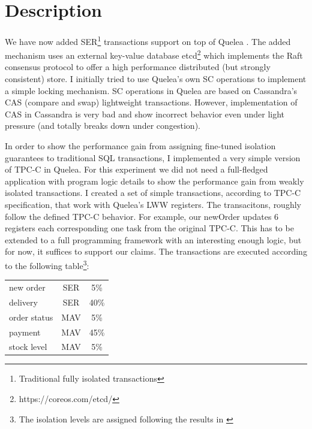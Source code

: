 \documentclass[12pt,letter]{article}
\begin{document}


\section{Description}
\paragraph{}
We have now added SER\footnote{Traditional fully isolated transactions}
transactions support on top of Quelea \cite{quelea}. The added mechanism uses an
external key-value database etcd\footnote{https://coreos.com/etcd/}
which implements the Raft consensus protocol to offer a high performance
distributed (but strongly consistent) store. I initially tried to use
Quelea's own SC operations to implement a simple locking mechanism. SC operations in Quelea are based on Cassandra's CAS
(compare and swap) lightweight transactions. However, implementation of CAS 
in Cassandra is very bad and show incorrect behavior even under light pressure
(and totally breaks down under congestion). 

In order to show the performance gain from  assigning 
fine-tuned  isolation guarantees to traditional SQL transactions, I
implemented a very simple version of TPC-C in Quelea. For this
experiment we did not need a full-fledged application with program logic
details to show the performance gain from weakly isolated transactions.
I created a set of simple transactions, according to TPC-C
specification, that work with Quelea's
LWW registers. The transacitons,  roughly follow the defined TPC-C behavior. For
example, our newOrder updates 6 registers each corresponding one task
from the original TPC-C. This has to be extended to a full programming
framework with an interesting enough logic, but for now, it suffices to
support our claims. The transactions are executed according to the
following table\footnote{The isolation levels are assigned following the
results in \cite{Bailis:2013:HAT}}:
\begin{center}
\begin{tabular}{ |l|c|c| } 
 \hline
 new order & SER & 5\% \\ 
 delivery  & SER & 40\% \\ 
 order status & MAV & 5\% \\ 
 payment & MAV & 45\% \\ 
 stock level & MAV & 5\% \\ 
 \hline
\end{tabular}
\end{center}
\end{document}

